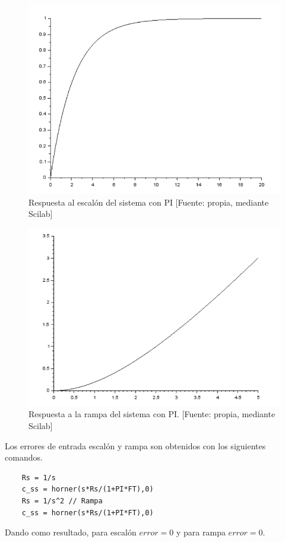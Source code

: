 \documentclass[12pt,letterpaper]{article}
\begin{document}
\begin{figure}[hbtp]
	\centering
	\includegraphics[width = 0.7 \columnwidth]{respuestaPIescalon.png} 
	\caption[Figura7]{Respuesta al escalón del sistema con PI [Fuente: propia, mediante Scilab]} 
	\label{fig:PIesc} 
\end{figure}

\begin{figure}[hbtp]
	\centering
	\includegraphics[width = 0.7 \columnwidth]{respuestaPIrampa.png} 
	\caption[Figura7]{Respuesta a la rampa del sistema con PI. [Fuente: propia, mediante Scilab]} 
	\label{fig:PIram} 
\end{figure}

Los errores de entrada escalón y rampa son obtenidos con los siguientes comandos.

\begin{verbatim}
    Rs = 1/s 
    c_ss = horner(s*Rs/(1+PI*FT),0)
    Rs = 1/s^2 // Rampa
    c_ss = horner(s*Rs/(1+PI*FT),0)
\end{verbatim}

Dando como resultado, para escalón $error = 0$ y para rampa $error = 0$.\\

\bigskip
\end{document}
